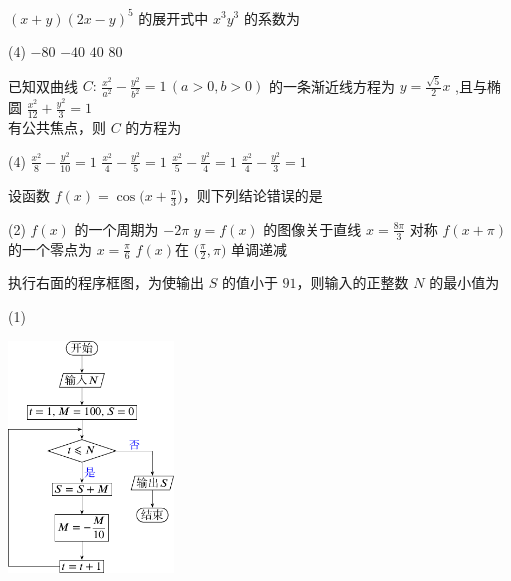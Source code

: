 \documentclass[11pt,space]{ctexart}
\begin{document}
\begin{enumerate}[itemsep=0.2em,topsep=0pt]
	\item $(x+y)(2x-y)^5$ 的展开式中 $x^3y^3$ 的系数为 
	\begin{tasks}(4)
		\task $-80$ \task $-40$ \task $40$ \task $80$ 
	\end{tasks}
	\item 已知双曲线 $C\colon\,\tfrac{x^2}{a^2}-\tfrac{y^2}{b^2}=1\,(a>0,b>0)$ 的一条渐近线方程为 $y=\tfrac{\sqrt{5}}{2}x$ ,且与椭圆
	$\tfrac{x^2}{12}+\tfrac{y^2}{3}=1$\\ 有公共焦点，则 $C$ 的方程为
	\begin{tasks}(4)
		\task $\frac{x^2}{8}-\frac{y^2}{10}=1$ \task $\frac{x^2}{4}-\frac{y^2}{5}=1$ \task $\frac{x^2}{5}-\frac{y^2}{4}=1$ \task $\frac{x^2}{4}-\frac{y^2}{3}=1$ 
	\end{tasks}
	\item 设函数 $f(x)=\cos\big(x+\tfrac{\pi}{3}\big)$，则下列结论错误的是
	\begin{tasks}(2)
		\task $f(x)$ 的一个周期为 $-2\pi$ \task $y=f(x)$ 的图像关于直线 $x=\frac{8\pi}{3}$ 对称
		\task $f(x+\pi)$ 的一个零点为 $x=\frac{\pi}{6}$ \task  $f(x)$在 $\Big(\frac{\pi}{2},\pi\Big)$ 单调递减 
	\end{tasks}
	\begin{minipage}[h][10ex][t]{.22\textwidth}\item 执行右面的程序框图，为使输出 $S$ 的值小于 $91$，则输入的正整数 $N$ 的最小值为
		\begin{tasks}(1)
			    
	\end{tasks}\end{minipage}
	\begin{minipage}[h][20ex][t]{.25\textwidth}\vspace{3em}
		\includegraphics[width=4.4cm]{liuchengtu.pdf}
	\end{minipage}\vspace{12em}
	

\end{enumerate}
\end{document}
